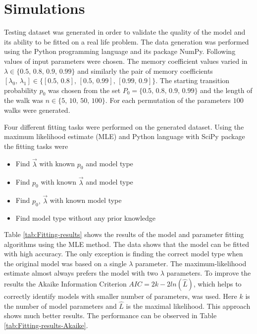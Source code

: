\documentclass{amsart}
\theoremstyle{definition}
\theoremstyle{plain}
\theoremstyle{plain}
\numberwithin{equation}{section}
\begin{document}
\section{Simulations\label{sec:Simulations}}

Testing dataset was generated in order to validate the quality of
the model and its ability to be fitted on a real life problem. The
data generation was performed using the Python programming language
and its package NumPy. Following values of input parameters were chosen.
The memory coefficient values varied in $\lambda\in\{0.5,\,0.8,\,0.9,\,0.99\}$
and similarly the pair of memory coefficients $[\lambda_{0},\,\lambda_{1}]\in\{[0.5,\,0.8],\,[0.5,\,0.99],\,[0.99,\,0.9]\}$.
The starting transition probability $p_{0}$ was chosen from the set
$P_{0}=\{0.5,\,0.8,\,0.9,\,0.99\}$ and the length of the walk was
\textbf{$n\in\{5,\,10,\,50,\,100\}$}. For each permutation of the
parameters $100$ walks were generated.

Four different fitting tasks were performed on the generated dataset.
Using the maximum likelihood estimate (MLE) \cite{rossi2018mathematical}
and Python language with SciPy package the fitting tasks were

\begin{itemize}
\item Find $\overrightarrow{\lambda}$ with known $p_{0}$ and model type
\item Find $p_{0}$ with known $\overrightarrow{\lambda}$ and model type
\item Find $p_{0},\,\overrightarrow{\lambda}$ with known model type
\item Find model type without any prior knowledge
\end{itemize}

Table \ref{tab:Fitting-results} shows the results of the model and
parameter fitting algorithms using the MLE method. The data shows that
the model can be fitted with high accuracy. The only exception is
finding the correct model type when the original model was based on
a single $\lambda$ parameter. The maximum-likelihood estimate almost
always prefers the model with two $\lambda$ parameters. To improve
the results the Akaike Information Criterion $AIC=2k-2ln(\hat{L})$,
which helps to correctly identify models with smaller number of parameters,
was used. Here $k$ is the number of model parameters and $\hat{L}$
is the maximal likelihood. This approach shows much better results.
The performance can be observed in Table \ref{tab:Fitting-results-Akaike}.
\end{document}
